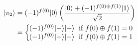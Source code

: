 \documentclass[preview]{standalone}
\begin{document}
\begin{align*}
|\pi_2\rangle &= (-1)^{f(0)}|0\rangle \left( \frac{|0\rangle + (-1)^{f(0)\oplus f(1)} |1\rangle}{\sqrt{2}}\right) \\ &=  \left\{ \begin{array}{ll} \hspace{-2mm} (-1)^{f(0)} |-\rangle |+\rangle \; \text{ if } f(0) \oplus f(1) = 0 \\ \hspace{-2mm} (-1)^{f(0)} |-\rangle|-\rangle \; \text{ if } f(0) \oplus f(1) = 1 \end{array} \right.
\end{align*}
\end{document}

